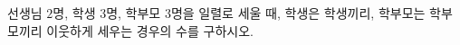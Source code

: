 \hspace*{2mm}\begin{minipage}[t]{\dimexpr\linewidth-2mm\relax}\vspace{0pt}
선생님 $2$명, 학생 $3$명, 학부모 $3$명을 일렬로 세울 때, 학생은 학생끼리, 학부모는 학부모끼리 이웃하게 세우는 경우의 수를 구하시오.\end{minipage}
